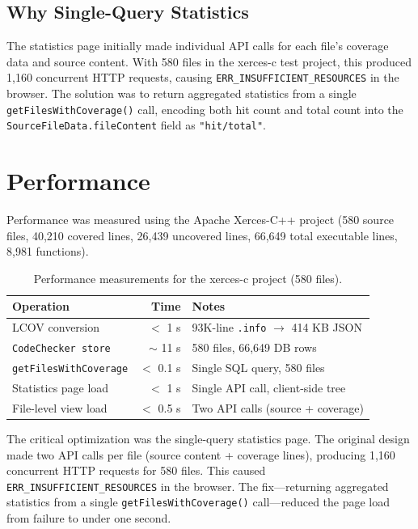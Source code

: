 \subsection{Why Single-Query Statistics}

The statistics page initially made individual API calls for each file's coverage data and source content. With 580 files in the xerces-c test project, this produced 1,160 concurrent HTTP requests, causing \texttt{ERR\_INSUFFICIENT\_RESOURCES} in the browser. The solution was to return aggregated statistics from a single \texttt{getFilesWithCoverage()} call, encoding both hit count and total count into the \texttt{SourceFileData.fileContent} field as \texttt{"hit/total"}.

\section{Performance}

Performance was measured using the Apache Xerces-C++ project (580 source files, 40,210 covered lines, 26,439 uncovered lines, 66,649 total executable lines, 8,981 functions).

\begin{table}[H]
\centering
\small
\begin{tabular}{|l|r|p{6cm}|}
\hline
\textbf{Operation} & \textbf{Time} & \textbf{Notes} \\
\hline
LCOV conversion & $<$ 1 s & 93K-line \texttt{.info} $\rightarrow$ 414 KB JSON \\
\hline
\texttt{CodeChecker store} & $\sim$ 11 s & 580 files, 66,649 DB rows \\
\hline
\texttt{getFilesWithCoverage} & $<$ 0.1 s & Single SQL query, 580 files \\
\hline
Statistics page load & $<$ 1 s & Single API call, client-side tree \\
\hline
File-level view load & $<$ 0.5 s & Two API calls (source + coverage) \\
\hline
\end{tabular}
\caption{Performance measurements for the xerces-c project (580 files).}
\label{tab:performance}
\end{table}

The critical optimization was the single-query statistics page. The original design made two API calls per file (source content + coverage lines), producing 1,160 concurrent HTTP requests for 580 files. This caused \texttt{ERR\_INSUFFICIENT\_RESOURCES} in the browser. The fix---returning aggregated statistics from a single \texttt{getFilesWithCoverage()} call---reduced the page load from failure to under one second.

